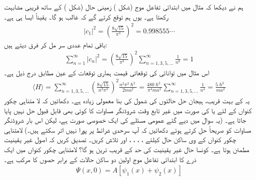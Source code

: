 ہم نے دیکھا  کہ مثال  میں ابتدائی تفاعل موج (شکل ) زمینی حال  (شکل ) کے ساتھ قریبی مشابہت رکھتا ہے۔ یوں ہم توقع کرتے گے کہ   غالب ہو گا۔ یقیناً ایسا ہی ہے۔
\begin{align*}
\left| c_{1} \right|^{2} = \left( \frac{8\sqrt{15}}{\pi^{3}} \right)^{2} = 0.998555 \cdots
\end{align*}
باقی تمام عددی سر مل کر فرق دیتے ہیں:
\begin{align*}
\sum_{n=1}^{\infty} \left| c_{n} \right|^{2} = \left( \frac{8\sqrt{15}}{\pi^{3}} \right)^{2} \sum_{n=1,3,5,...}^{\infty} \frac{1}{n^{6}} = 1
\end{align*}
اس مثال میں توانائی کی توقعاتی قیمت ہماری توقعات کے عین مطابق درج ذیل ہے۔
\begin{align*}
\langle H \rangle = \sum_{n=1,3,5,...}^{\infty} \left( \frac{8\sqrt{15}}{n^{3} \pi^{3}} \right)^{2} \frac{n^{2} \pi^{2} \hslash^{2}}{2ma^{2}} = \frac{480\hslash^{2}}{\pi^{4} ma^{2}} \sum_{n=1,3,5,...}^{\infty} \frac{1}{n^{4}} = \frac{5 \hslash^{2}}{ma^{2}}
\end{align*}
 یہ  کے بہت قریب،  ہیجان حل حالتوں کی شمول کی بنا معمولی زیادہ ہے۔ 
دکھائیں کہ لا متناہی چکور کنواں کے لئے   یا  کی صورت میں  غیر تابع وقت شروڈنگر مساوات کا کوئی بھی قابل قبول حل  نہیں پایا جاتا ہے۔ (یہ سوال  میں دیے گئے عمومی مسئلے کی ایک خصوصی صورت ہے، لیکن اس بار شروڈنگر مساوات کو صریحاً حل کرتے ہوئے دکھائیں کہ آپ سرحدی شرائط پر پورا نہیں اتر سکتے ہیں۔)
لامتناہی چکور کنواں کے  وی ساکن حال کیلئے ،  ، ، ،   اور   تلاش کریں۔ تصدیق کریں کہ اصول غیر یقینیت مطمئن ہوتا ہے۔ کونسا حال غیر یقینیت کی حد کے قریب ترین ہو گا؟
لامتناہی چکور کنواں میں ایک ذرے کا ابتدائی تفاعل موج اولین دو ساکن حالات کے برابر حصوں کا مرکب ہے۔ 
\begin{align*}
\Psi(x,0) = A[\psi_{1}(x) + \psi_{2}(x)]
\end{align*}

